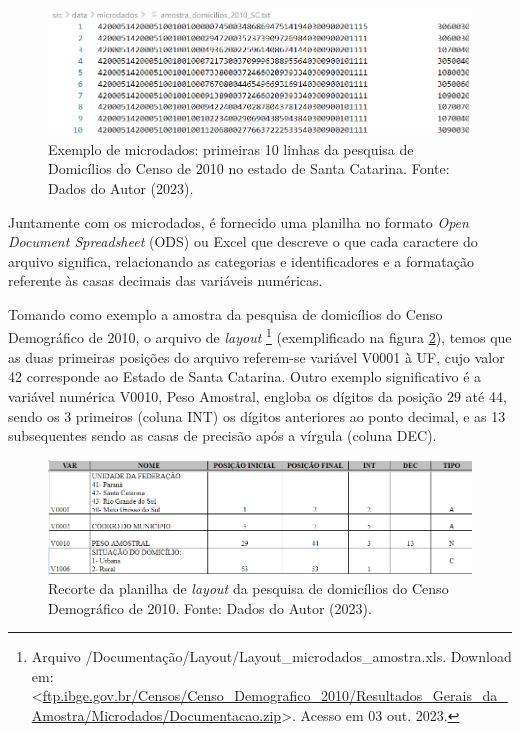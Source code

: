 \begin{figure}[ht]
    \centering
    \includegraphics[width=\textwidth]{files/img/exemplo_microdado.png}
    \caption{Exemplo de microdados: primeiras 10 linhas da pesquisa de Domicílios do Censo de 2010 no estado de Santa Catarina. Fonte: Dados do Autor (2023).}
    \label{fig:exemplo-microdado}
\end{figure}

    Juntamente com os microdados, é fornecido uma planilha no formato \textit{Open Document Spreadsheet} (ODS) ou Excel que descreve o que cada caractere do arquivo significa, relacionando as categorias e identificadores e a formatação referente às casas decimais das variáveis numéricas. 
    
    Tomando como exemplo a amostra da pesquisa de domicílios do Censo Demográfico de 2010, o arquivo de \textit{layout}
    \footnote{Arquivo /Documentação/Layout/Layout\_microdados\_amostra.xls. Download em: <\url{ftp.ibge.gov.br/Censos/Censo_Demografico_2010/Resultados_Gerais_da_Amostra/Microdados/Documentacao.zip}>. Acesso em 03 out. 2023.} (exemplificado na figura \ref{fig:layout-domi}), temos que as duas primeiras posições do arquivo referem-se variável V0001 à UF, cujo valor 42 corresponde ao Estado de Santa Catarina. Outro exemplo significativo é a variável numérica V0010, Peso Amostral, engloba os dígitos da posição 29 até 44, sendo os 3 primeiros (coluna INT) os dígitos anteriores ao ponto decimal, e as 13 subsequentes sendo as casas de precisão após a vírgula (coluna DEC).

\begin{figure}[ht]
    \centering
    \includegraphics[width=\textwidth]{files/img/layout amostra domicilios 2010.png}
    \caption{Recorte da planilha de \textit{layout} da pesquisa de domicílios do Censo Demográfico de 2010. Fonte: Dados do Autor (2023).}
    \label{fig:layout-domi}
\end{figure}

